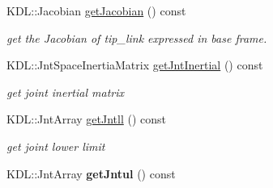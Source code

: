 \begin{DoxyCompactItemize}
K\+D\+L\+::\+Jacobian \hyperlink{classrobot_1_1_robot_model_a576f026cf5bdde060c7f9e5462d09d79}{get\+Jacobian} () const
\begin{DoxyCompactList}\small\item\em get the Jacobian of tip\+\_\+link expressed in base frame. \end{DoxyCompactList}\item 
K\+D\+L\+::\+Jnt\+Space\+Inertia\+Matrix \hyperlink{classrobot_1_1_robot_model_ab28ac790b5af19545883936fd35e1729}{get\+Jnt\+Inertial} () const
\begin{DoxyCompactList}\small\item\em get joint inertial matrix \end{DoxyCompactList}\item 
K\+D\+L\+::\+Jnt\+Array \hyperlink{classrobot_1_1_robot_model_a95be846aacc37798d95a24ec6540b64c}{get\+Jntll} () const
\begin{DoxyCompactList}\small\item\em get joint lower limit \end{DoxyCompactList}\item 
\mbox{\label{classrobot_1_1_robot_model_a4b1b428b7bfdfcec98dcfed6056db29f}} 
K\+D\+L\+::\+Jnt\+Array {\bfseries get\+Jntul} () const
\end{DoxyCompactItemize}
